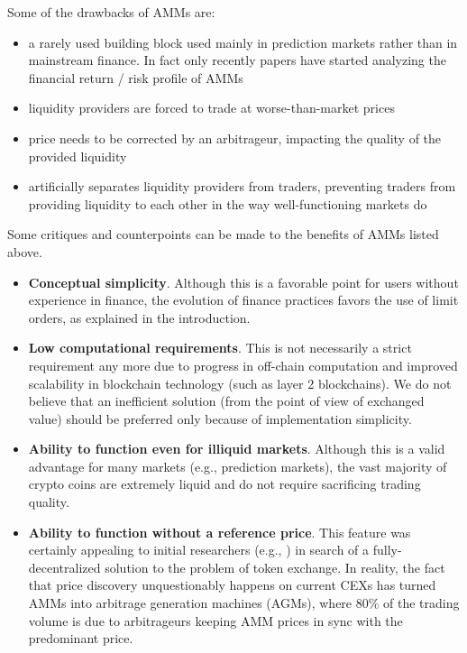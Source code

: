 \documentclass[11pt, reqno]{amsart}
\theoremstyle{definition}
\theoremstyle{remark}
\begin{document}
Some of the drawbacks of AMMs are:
\begin{itemize}
    \item a rarely used building block used mainly in prediction markets rather than
          in mainstream finance. In fact only recently papers have started analyzing
          the financial return / risk profile of AMMs \cite{MiMoRoZh22}
    \item liquidity providers are forced to trade at worse-than-market prices
    \item price needs to be corrected by an arbitrageur, impacting the quality of
          the provided liquidity
    \item artificially separates liquidity providers from traders, preventing traders
          from providing liquidity to each other in the way well-functioning
          markets do
\end{itemize}

Some critiques and counterpoints can be made to the benefits of AMMs listed above.
\begin{itemize}
    \item \textbf{Conceptual simplicity}.
          Although this is a favorable point for users
          without experience in finance, the evolution of finance practices favors the
          use of limit orders, as explained in the introduction.
    \item \textbf{Low computational requirements}.
          This is not necessarily a strict
          requirement any more due to progress in off-chain computation and
          improved scalability in blockchain technology (such as layer 2
          blockchains). We do not believe that an inefficient solution (from
          the point of view of exchanged value) should be preferred only
          because of implementation simplicity.
    \item \textbf{Ability to function even for illiquid markets}.
          Although this is a valid advantage for many markets (e.g., prediction markets),
          the vast majority of crypto coins are extremely liquid and do not require
          sacrificing trading quality.
    \item \textbf{Ability to function without a reference price}.
          This feature was certainly appealing to initial researchers (e.g., \cite{Bu17})
          in search of a fully-decentralized solution to the problem
          of token exchange. In reality, the fact that price discovery unquestionably
          happens on current CEXs has turned AMMs into arbitrage generation machines
          (AGMs), where 80\% of the trading volume is due to arbitrageurs keeping AMM
          prices in sync with the predominant price.
\end{itemize}
\end{document}
